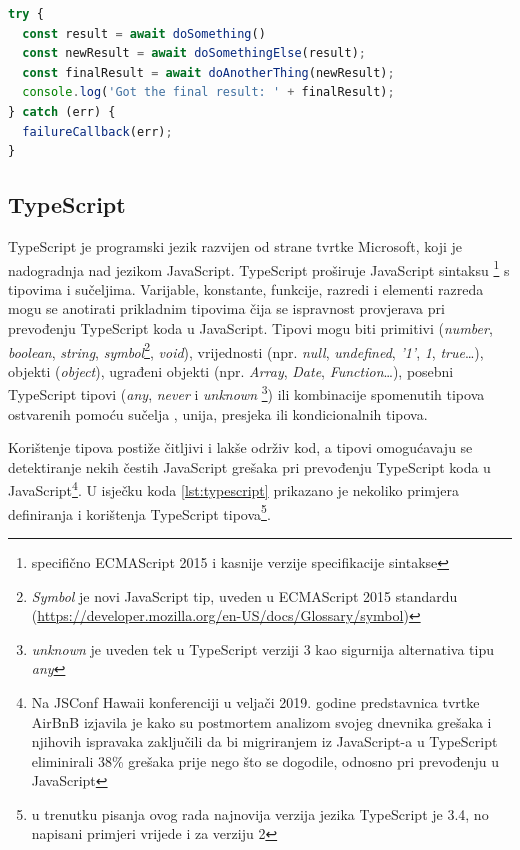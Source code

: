 \documentclass[times, utf8, diplomski, numeric]{fer}
\newcommand{\razmakp}{\vspace{18pt}}
\newcommand{\razmaks}{\vspace{10pt}}
\begin{document}
\razmakp %
\begin{lstlisting}[language=JavaScript, caption={Primjer korištenja ECMAScript 2017 sintakse}, label={lst:await}]
try {
  const result = await doSomething()
  const newResult = await doSomethingElse(result);
  const finalResult = await doAnotherThing(newResult);
  console.log('Got the final result: ' + finalResult);
} catch (err) {
  failureCallback(err);
}
\end{lstlisting}
\razmaks


\newpage
\subsection{TypeScript} \label{sec:ts}

TypeScript je programski jezik razvijen od strane tvrtke Microsoft, koji je nadogradnja  nad jezikom JavaScript.
TypeScript proširuje JavaScript sintaksu \footnote{specifično ECMAScript 2015 i kasnije verzije specifikacije sintakse} s tipovima i sučeljima.
Varijable, konstante, funkcije, razredi i elementi razreda mogu se anotirati prikladnim tipovima čija se ispravnost provjerava pri prevođenju TypeScript koda u JavaScript.
Tipovi mogu biti primitivi (\emph{number}, \emph{boolean}, \emph{string}, \emph{symbol}\footnote{
    \emph{Symbol} je novi JavaScript tip, uveden u ECMAScript 2015 standardu (\url{https://developer.mozilla.org/en-US/docs/Glossary/symbol})
}, \emph{void}), vrijednosti (npr. \emph{null}, \emph{undefined}, \emph{'1'}, \emph{1}, \emph{true}…), objekti (\emph{object}), ugrađeni objekti (npr. \emph{Array}, \emph{Date}, \emph{Function}…), posebni TypeScript tipovi (\emph{any}, \emph{never} i \emph{unknown} \footnote{
    \emph{unknown} je uveden tek u TypeScript verziji 3 kao sigurnija alternativa tipu \emph{any}\citep{ts_hand}
}) ili kombinacije spomenutih tipova ostvarenih pomoću sučelja , unija, presjeka ili kondicionalnih tipova.\citep{gh_ts_spec}\citep{ts_hand}

Korištenje tipova postiže čitljivi i lakše održiv kod, a tipovi omogućavaju se detektiranje nekih čestih JavaScript grešaka pri prevođenju TypeScript koda u JavaScript\footnote{
    Na JSConf Hawaii konferenciji u veljači 2019. godine predstavnica tvrtke AirBnB izjavila je kako su postmortem analizom svojeg dnevnika grešaka i njihovih ispravaka zaključili da bi migriranjem iz JavaScript-a u TypeScript eliminirali 38\% grešaka prije nego što se dogodile, odnosno pri prevođenju u JavaScript\citep{yt_ts}
}.
U isječku koda \ref{lst:typescript} prikazano je nekoliko primjera definiranja i korištenja TypeScript tipova\footnote{
    u trenutku pisanja ovog rada najnovija verzija jezika TypeScript je 3.4, no napisani primjeri vrijede i za verziju 2
}.
\end{document}

